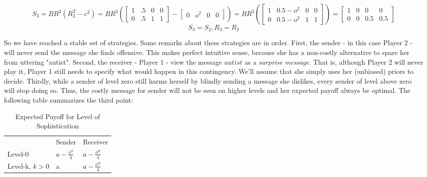 \documentclass[10]{article}
\begin{document}
\begin{equation*}
S_3=
BR^2(R_2^T-c^2)=
BR^2(
\begin{bmatrix}
1 & .5 & 0 & 0\\
0 & .5 & 1 & 1
\end{bmatrix}
-
\begin{bmatrix}
0 & o^2 & 0 & 0
\end{bmatrix}
)
=
BR^2(
\begin{bmatrix}
 1      & 0.5-o^2   & 0  & 0   \\
0     & 0.5-o^2   & 1      & 1 
\end{bmatrix}
)
=
\begin{bmatrix}
1 & 0 & 0 & 0\\
0 & 0 & 0.5 & 0.5
\end{bmatrix}
\end{equation*}
\begin{equation*}
S_3=S_2,
R_3=R_2
\end{equation*}

So we have reached a stable set of strategies. Some remarks about these strategies are in order. First, the sender - in this case Player 2 - will never send the message she finds offensive. This makes perfect intuitive sense, because she has a non-costly alternative to spare her from uttering "autist". Second, the receiver - Player 1 - view the message $autist$ as a \textit{surprise message}. That is, although Player 2 will never play it, Player 1 still needs to specify what would happen in this contingency. We'll assume that she simply uses her (unbiased) priors to decide.
Thirdly, while a sender of level zero still harms herself by blindly sending a message she dislikes, every sender of level above zero will stop doing so. Thus, the costly message for sender will not be seen on higher levels and her expected payoff  always be optimal.
The following table summarizes the third point:
\begin{table}[h]
\centering
\caption{Expected Payoff for Level of Sophistication}
\label{my-label}
\begin{tabular}{lll}
                                    & Sender                                  & Receiver                                \\ \cline{2-3} 
\multicolumn{1}{l|}{Level-0}        & \multicolumn{1}{l|}{$a-\tfrac{o^S}{4}$} & \multicolumn{1}{l|}{$a-\tfrac{o^R}{4}$} \\ \cline{2-3} 
\multicolumn{1}{l|}{Level-k, $k>0$} & \multicolumn{1}{l|}{a}                  & \multicolumn{1}{l|}{$a-\tfrac{o^R}{4}$} \\ \cline{2-3} 
\end{tabular}
\end{table}
\end{document}
